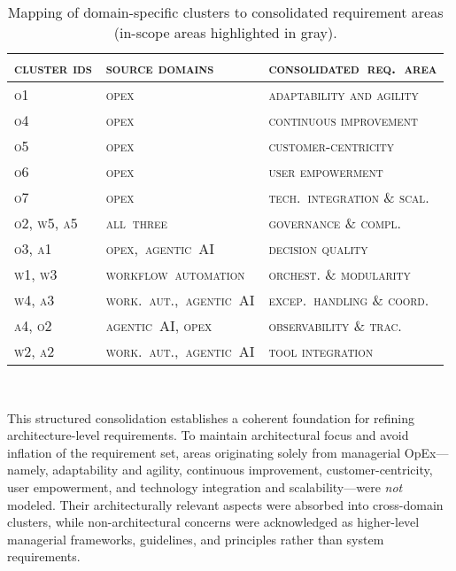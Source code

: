 \begin{table}[h!]
  \centering
  \begin{tabular}{p{2.7cm} p{5cm} p{5.5cm}}
    \toprule
    \textsc{cluster ids} & \textsc{source domains} & \textsc{consolidated~req.~area} \\
    \midrule
    \textsc{o1} & \textsc{opex} & \textsc{adaptability and agility} \\
    \textsc{o4} & \textsc{opex} & \textsc{continuous improvement} \\
    \textsc{o5} & \textsc{opex} & \textsc{customer-centricity} \\
    \textsc{o6} & \textsc{opex} & \textsc{user empowerment} \\
    \textsc{o7} & \textsc{opex}& \textsc{tech.~integration \& scal.} \\
    \rowcolor{gray!12}\textsc{o2, w5, a5} & \textsc{all~three} & \textsc{governance \& compl.} \\
    \rowcolor{gray!12}\textsc{o3, a1} & \textsc{opex,~agentic~AI} & \textsc{decision quality} \\
    \rowcolor{gray!12}\textsc{w1, w3} & \textsc{workflow~automation} & \textsc{orchest. \& modularity} \\
    \rowcolor{gray!12}\textsc{w4, a3} & \textsc{work.~aut.,~agentic~AI} & \textsc{excep.~handling \& coord.} \\
    \rowcolor{gray!12}\textsc{a4, o2} & \textsc{agentic~AI, opex} & \textsc{observability \& trac.} \\
    \rowcolor{gray!12}\textsc{w2, a2} & \textsc{work.~aut.,~agentic~AI} & \textsc{tool integration} \\
    \bottomrule
  \end{tabular}
  \caption{Mapping of domain-specific clusters to consolidated requirement areas (in-scope areas highlighted in gray).}~\label{tab:req-clustering}
\end{table}

This structured consolidation establishes a coherent foundation for refining \\ architecture-level requirements. To maintain architectural focus and avoid inflation of the requirement set, areas originating solely from managerial OpEx—namely, adaptability and agility, continuous improvement, customer-centricity, user empowerment, and technology integration and scalability—were \emph{not} modeled. Their architecturally relevant aspects were absorbed into cross-domain clusters, while non-architectural concerns were acknowledged as higher-level managerial frameworks, guidelines, and principles rather than system requirements.


